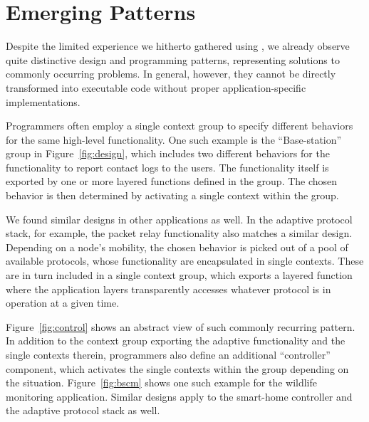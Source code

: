 \section{Emerging Patterns}
\label{sec:patterns}

Despite the limited experience we hitherto gathered using \conesc, we
already observe quite distinctive design and programming patterns,
representing solutions to commonly occurring problems. In general,
however, they cannot be directly transformed into executable code
without proper application-specific implementations.


 Programmers often employ a single context
group to specify different behaviors for the same high-level
functionality. One such example is the ``Base-station'' group in
Figure~\ref{fig:design}, which includes two different behaviors for
the functionality to report contact logs to the users. The
functionality itself is exported by one or more layered functions
defined in the group. The chosen behavior is then determined by
activating a single context within the group.

We found similar designs in other applications as well. In the
adaptive protocol stack, for example, the packet relay functionality
also matches a similar design. Depending on a node's mobility, the
chosen behavior is picked out of a pool of available protocols, whose
functionality are encapsulated in single contexts. These are in turn
included in a single context group, which exports a layered function
where the application layers transparently accesses whatever protocol
is in operation at a given time.


Figure~\ref{fig:control} shows an abstract view of such commonly
recurring pattern. In addition to the context group exporting the
adaptive functionality and the single contexts therein, programmers
also define an additional ``controller'' component, which activates
the single contexts within the group depending on the
situation. Figure~\ref{fig:bscm} shows one such example for the
wildlife monitoring application. Similar designs apply to the
smart-home controller and the adaptive protocol stack as well.

